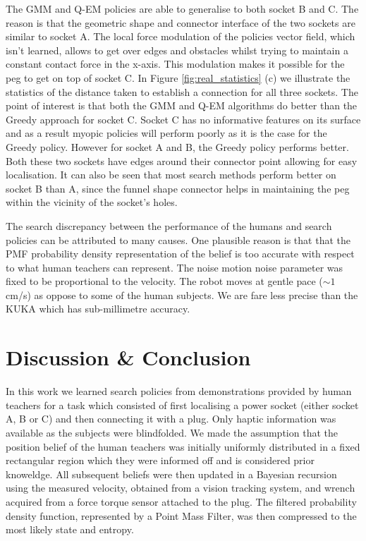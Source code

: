 The GMM and Q-EM policies are able to generalise to both socket B and C. The reason is that the geometric shape and connector interface of the 
two sockets are similar to socket A. The local force modulation of the policies vector field, which isn't learned, allows to get over edges and obstacles
whilst trying to maintain a constant contact force in the x-axis. This modulation makes it possible for the peg to get on top of socket C.
In Figure \ref{fig:real_statistics} (c) we illustrate the statistics of the distance taken to establish a connection for all three sockets. 
The point of interest is that both the GMM and Q-EM algorithms do better than the Greedy approach for socket C. Socket C has no informative 
features on its surface and as a result myopic policies will perform poorly as it is the case for the Greedy policy. However for socket A 
and B, the Greedy policy performs better. Both these two sockets have edges around their connector point allowing for easy localisation. 
It can also be seen that most search methods perform better on socket B than A, since the funnel shape connector helps in maintaining the peg 
within the vicinity of the socket's holes. 


The search discrepancy between the performance of the humans and search policies can be attributed to many causes. One plausible reason is that 
that the PMF probability density representation of the belief is too accurate with respect to what human teachers can represent. 
The noise motion noise parameter was fixed to be proportional to the velocity. The robot moves at gentle pace ($\sim1$ cm/s) as oppose to some of the human subjects. We
are fare less precise than the KUKA which has sub-millimetre accuracy.

\section{Discussion \& Conclusion}\label{ch4:conclusion}
%
%
%

In this work we learned search policies from demonstrations provided by human teachers for a task
which consisted of first localising a power socket (either socket A, B or C) and then connecting it with a plug. Only haptic information 
was available as the subjects were blindfolded. We made the assumption that the position belief of the human teachers 
was initially uniformly distributed in a fixed rectangular region which they were 
informed off and is considered prior knoweldge. All subsequent beliefs were then updated in a Bayesian recursion 
using the measured velocity, obtained from a vision tracking system, and wrench acquired from a force torque sensor attached 
to the plug. The filtered probability density function, represented by a Point Mass Filter, was then compressed to the 
most likely state and entropy.


